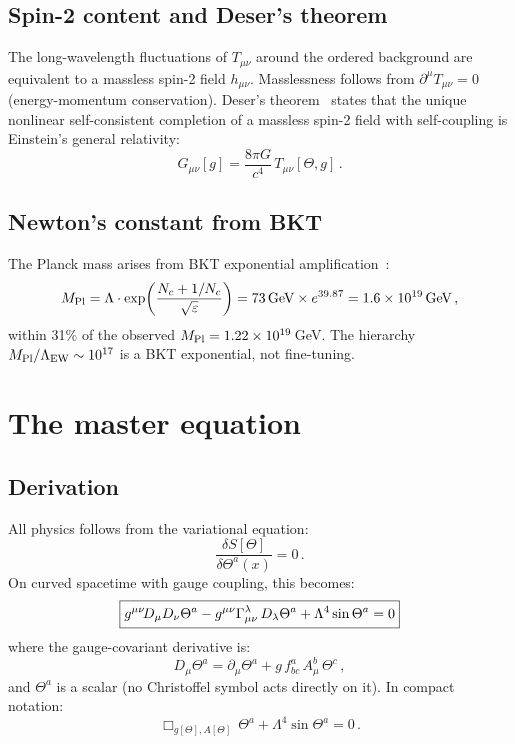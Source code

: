 \documentclass[twocolumn,preprintnumbers,amsmath,amssymb,prd]{revtex4-2}
\begin{document}
\subsection{Spin-2 content and Deser's theorem}

The long-wavelength fluctuations of $T_{\mu\nu}$ around the ordered background are equivalent to a massless spin-2 field $h_{\mu\nu}$.
Masslessness follows from $\partial^\mu T_{\mu\nu} = 0$ (energy-momentum conservation).
Deser's theorem~\cite{Deser1970} states that the unique nonlinear self-consistent completion of a massless spin-2 field with self-coupling is Einstein's general relativity:
\begin{equation}
G_{\mu\nu}[g] = \frac{8\pi G}{c^4}\,T_{\mu\nu}[\Theta, g]\,.
\label{eq:einstein}
\end{equation}

\subsection{Newton's constant from BKT}

The Planck mass arises from BKT exponential amplification~\cite{Paper6,Paper8}:
\begin{equation}
M_{\rm Pl} = \Lambda\cdot\exp\!\left(\frac{N_c + 1/N_c}{\sqrt{\varepsilon}}\right) = 73\,\text{GeV}\times e^{39.87} = 1.6\times10^{19}\,\text{GeV}\,,
\label{eq:Mpl}
\end{equation}
within 31\% of the observed $M_{\rm Pl} = 1.22\times10^{19}\,$GeV.
The hierarchy $M_{\rm Pl}/\Lambda_{\rm EW} \sim 10^{17}$ is a BKT exponential, not fine-tuning.

\section{The master equation}
\label{sec:master}

\subsection{Derivation}

All physics follows from the variational equation:
\begin{equation}
\frac{\delta S[\Theta]}{\delta\Theta^a(x)} = 0\,.
\end{equation}
On curved spacetime with gauge coupling, this becomes:
\begin{equation}
\boxed{%
g^{\mu\nu}\!D_\mu D_\nu\Theta^a - g^{\mu\nu}\Gamma^\lambda_{\mu\nu}\,D_\lambda\Theta^a + \Lambda^4\sin\Theta^a = 0}
\label{eq:master}
\end{equation}
where the gauge-covariant derivative is:
\begin{equation}
D_\mu\Theta^a = \partial_\mu\Theta^a + g\,f^a_{bc}\,A_\mu^b\,\Theta^c\,,
\end{equation}
and $\Theta^a$ is a scalar (no Christoffel symbol acts directly on it).
In compact notation:
\begin{equation}
\Box_{g[\Theta],A[\Theta]}\,\Theta^a + \Lambda^4\sin\Theta^a = 0\,.
\label{eq:master_compact}
\end{equation}
\end{document}

